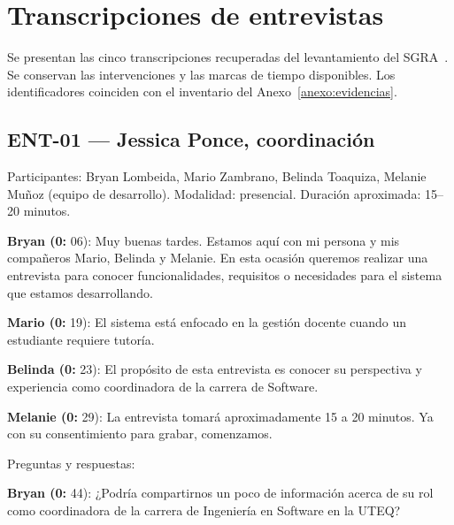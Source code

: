 \section{Transcripciones de entrevistas}
\label{anexo:transcripciones}

Se presentan las cinco transcripciones recuperadas del levantamiento del SGRA~\cite{SGRA-documentacion-original}. Se conservan las intervenciones y las marcas de tiempo disponibles. Los identificadores coinciden con el inventario del Anexo~\ref{anexo:evidencias}.

\begingroup
\small
{}

\subsection{ENT-01 — Jessica Ponce, coordinación}
\label{transcripcion:ent01}

Participantes: Bryan Lombeida, Mario Zambrano, Belinda Toaquiza, Melanie Muñoz (equipo de desarrollo). Modalidad: presencial. Duración aproximada: 15–20 minutos.\par\smallskip

\noindent\textbf{Bryan (0:} 06): Muy buenas tardes. Estamos aquí con mi persona y mis compañeros Mario, Belinda y Melanie. En esta ocasión queremos realizar una entrevista para conocer funcionalidades, requisitos o necesidades para el sistema que estamos desarrollando.\par\smallskip

\noindent\textbf{Mario (0:} 19): El sistema está enfocado en la gestión docente cuando un estudiante requiere tutoría.\par\smallskip

\noindent\textbf{Belinda (0:} 23): El propósito de esta entrevista es conocer su perspectiva y experiencia como coordinadora de la carrera de Software.\par\smallskip

\noindent\textbf{Melanie (0:} 29): La entrevista tomará aproximadamente 15 a 20 minutos. Ya con su consentimiento para grabar, comenzamos.\par\smallskip

Preguntas y respuestas:\par\smallskip

\noindent\textbf{Bryan (0:} 44): ¿Podría compartirnos un poco de información acerca de su rol como coordinadora de la carrera de Ingeniería en Software en la UTEQ?\par\smallskip

